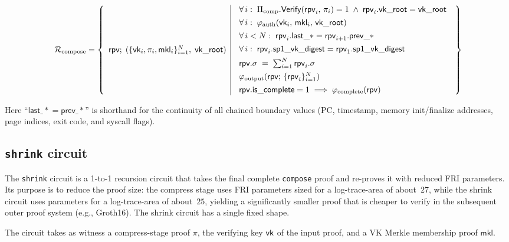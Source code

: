 \documentclass[11pt]{article}
\begin{document}
$$\mathcal{R}_{\mathrm{compose}}=\left\lbrace\begin{array}{c|c}
  \mathsf{rpv}
  ;\;
  (\{\mathsf{vk}_i,\pi_i,\mathsf{mkl}_i\}_{i=1}^{N},\;\mathsf{vk\_root})
  &
  \begin{array}{l}
  \forall\, i:\;
    \Pi_{\mathrm{comp}}.\mathsf{Verify}(\mathsf{rpv}_i,\,\pi_i)=1
    \;\wedge\;
    \mathsf{rpv}_i.\mathsf{vk\_root}=\mathsf{vk\_root}\\[4pt]
  \forall\, i:\;
    \varphi_{\mathrm{auth}}(\mathsf{vk}_i,\,\mathsf{mkl}_i,\,\mathsf{vk\_root})\\[4pt]
  \forall\, i<N:\;
    \mathsf{rpv}_i.\mathsf{last\_*}
    = \mathsf{rpv}_{i+1}.\mathsf{prev\_*}\\[4pt]
  \forall\, i:\;
    \mathsf{rpv}_i.\mathsf{sp1\_vk\_digest}
    = \mathsf{rpv}_1.\mathsf{sp1\_vk\_digest}\\[4pt]
  \mathsf{rpv}.\sigma \;=\;
    \textstyle\sum_{i=1}^{N} \mathsf{rpv}_i.\sigma\\[4pt]
  \varphi_{\mathrm{output}}(\mathsf{rpv};\,\{\mathsf{rpv}_i\}_{i=1}^{N})\\[4pt]
  \mathsf{rpv}.\mathsf{is\_complete}=1
    \;\Longrightarrow\;
    \varphi_{\mathrm{complete}}(\mathsf{rpv})
  \end{array}
\end{array}\right\rbrace$$

\noindent
Here ``$\mathsf{last\_*}=\mathsf{prev\_*}$'' is shorthand for the continuity of all
chained boundary values
(PC, timestamp, memory init/finalize addresses, page indices,
exit code, and syscall flags).

\subsection{\texttt{shrink} circuit}\label{sec:shrink}

The \texttt{shrink} circuit is a 1-to-1 recursion circuit that takes the
final complete \texttt{compose} proof and re-proves it with reduced FRI
parameters.
Its purpose is to reduce the proof size: the compress stage uses
FRI parameters sized for a log-trace-area of about~$27$, while the shrink
circuit uses parameters for a log-trace-area of about~$25$, yielding a
significantly smaller proof that is cheaper to verify in the subsequent
outer proof system (e.g., Groth16).
The shrink circuit has a single fixed shape.

The circuit takes as witness
a compress-stage proof $\pi$,
the verifying key $\mathsf{vk}$ of the input proof,
and a VK Merkle membership proof $\mathsf{mkl}$.
\end{document}
